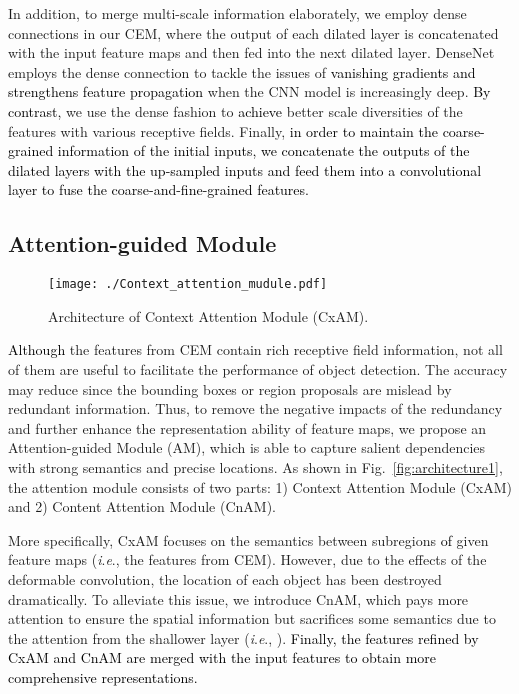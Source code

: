 \documentclass[journal]{IEEEtran}
\newcommand{\ie}{\textit{i}.\textit{e}.\xspace}
\def\myblue{\textcolor{black}}
\begin{document}
	
	In addition, to merge multi-scale information elaborately, we employ dense connections in our CEM, where the output of each dilated layer is concatenated with the input feature maps and then fed into the next dilated layer.
	DenseNet~\cite{huang2017densely} employs the dense connection to tackle the issues of 
\myblue{vanishing gradients and strengthens feature propagation}
	when the CNN model is increasingly deep. 
\myblue{By contrast,}
	we use the dense fashion to \myblue{achieve} better scale diversities of the features with various receptive fields. 
Finally, \myblue{in order to maintain the coarse-grained information of the initial inputs, we concatenate the outputs of the dilated layers with the up-sampled inputs and feed them into a  convolutional layer to fuse the coarse-and-fine-grained features.}




	\subsection{Attention-guided Module}
	
	\begin{figure}[t]
		\begin{center}
\texttt{[image: ./Context\_attention\_mudule.pdf]}
		\end{center}
\caption{Architecture of Context Attention Module (CxAM).}
		\label{fig:CxAM}
	\end{figure}


	
	\myblue{Although} the features from CEM contain rich receptive field information, not all of them are useful to facilitate the performance of object detection. The accuracy may reduce since the bounding boxes or region proposals are mislead by redundant information. Thus, to remove the negative impacts of the redundancy and further enhance the representation ability of feature maps, we propose an Attention-guided Module (AM), which is able to capture salient dependencies with strong semantics and precise locations. As shown in Fig.~\ref{fig:architecture1}, the attention module consists of two parts: 1) Context Attention Module (CxAM) and 2) Content Attention Module (CnAM).
	
	
	More specifically, CxAM focuses on the semantics between subregions \myblue{of} given feature maps (\ie, the features from CEM). However, due to the effects of the deformable convolution, the 
location
	of each object has been destroyed dramatically. To alleviate this issue, we introduce CnAM, which pays more attention to ensure the spatial information but sacrifices some semantics due to the attention from the shallower layer (\ie, ). 
\myblue{Finally, the features refined by CxAM and CnAM are merged with the input features to obtain more comprehensive representations.}
\end{document}
